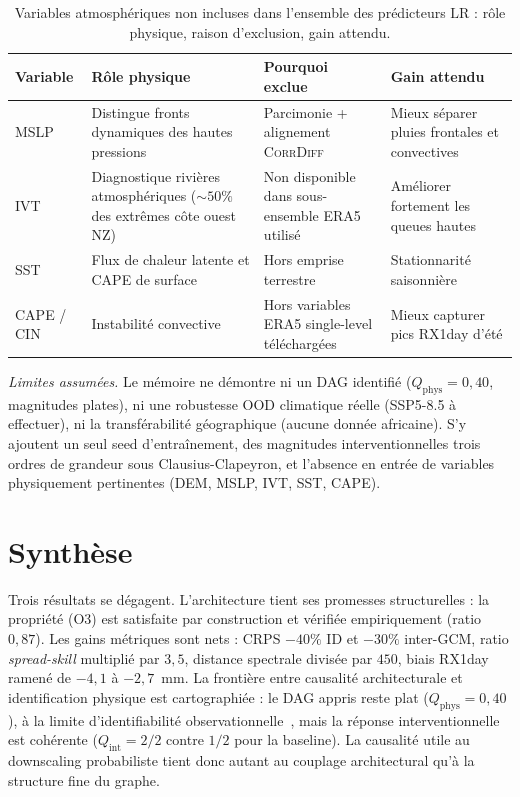 \documentclass[14pt,a4paper,openany]{extreport}
\theoremstyle{definition}
\newcommand{\CorrDiff}{\textsc{CorrDiff}}
\newcommand{\LR}{\ensuremath{\text{LR}}}
\begin{document}
\begin{table}[H]
  \centering
  \small
  \caption{Variables atmosphériques non incluses dans l'ensemble des prédicteurs \LR{} : rôle physique, raison d'exclusion, gain attendu.}
  \label{tab:exp-vars-missing}
  \begin{tabularx}{\linewidth}{l X X X}
    \toprule
    \textbf{Variable} & \textbf{Rôle physique} & \textbf{Pourquoi exclue} & \textbf{Gain attendu} \\
    \midrule
    MSLP & Distingue fronts dynamiques des hautes pressions & Parcimonie + alignement \CorrDiff{} & Mieux séparer pluies frontales et convectives \\
    IVT & Diagnostique rivières atmosphériques ($\sim 50\%$ des extrêmes côte ouest NZ) & Non disponible dans sous-ensemble ERA5 utilisé & Améliorer fortement les queues hautes \\
    SST & Flux de chaleur latente et CAPE de surface & Hors emprise terrestre & Stationnarité saisonnière \\
    CAPE / CIN & Instabilité convective & Hors variables ERA5 single-level téléchargées & Mieux capturer pics RX1day d'été \\
    \bottomrule
  \end{tabularx}
\end{table}

\noindent\emph{Limites assumées.} Le mémoire ne démontre ni un DAG identifié ($Q_{\mathrm{phys}}=0{,}40$, magnitudes plates), ni une robustesse OOD climatique réelle (SSP5-8.5 à effectuer), ni la transférabilité géographique (aucune donnée africaine). S'y ajoutent un seul seed d'entraînement, des magnitudes interventionnelles trois ordres de grandeur sous Clausius-Clapeyron, et l'absence en entrée de variables physiquement pertinentes (DEM, MSLP, IVT, SST, CAPE).

\section{Synthèse}
\label{sec:exp-synthese}

Trois résultats se dégagent. L'architecture tient ses promesses structurelles : la propriété (O3) est satisfaite par construction et vérifiée empiriquement (ratio $0{,}87$). Les gains métriques sont nets : CRPS $-40\%$ ID et $-30\%$ inter-GCM, ratio \emph{spread-skill} multiplié par $3{,}5$, distance spectrale divisée par $450$, biais RX1day ramené de $-4{,}1$ à $-2{,}7$~mm. La frontière entre causalité architecturale et identification physique est cartographiée : le DAG appris reste plat ($Q_{\mathrm{phys}}=0{,}40$), à la limite d'identifiabilité observationnelle~\cite{pearl_causality_2009}, mais la réponse interventionnelle est cohérente ($Q_{\mathrm{int}}=2/2$ contre $1/2$ pour la baseline). La causalité utile au downscaling probabiliste tient donc autant au couplage architectural qu'à la structure fine du graphe.
\end{document}

